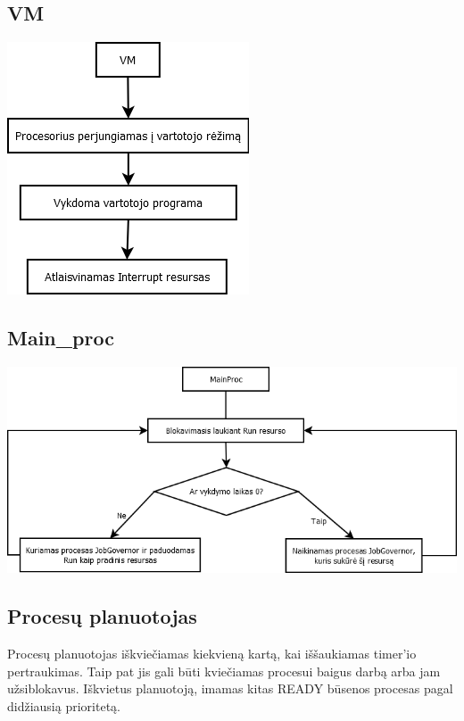 	\subsection{VM}
		\begin{center}
			\includegraphics[scale=0.9]{diagramos/VM.png}
		\end{center}
	\subsection{Main\_proc}
		\begin{center}
			\includegraphics[scale=0.7]{diagramos/mainProc.png}
		\end{center}
	\subsection{Procesų planuotojas}
		Procesų planuotojas iškviečiamas kiekvieną kartą, kai iššaukiamas timer'io pertraukimas. Taip pat jis gali būti kviečiamas procesui baigus darbą arba jam užsiblokavus. Iškvietus planuotoją, imamas kitas READY būsenos procesas pagal didžiausią prioritetą.
